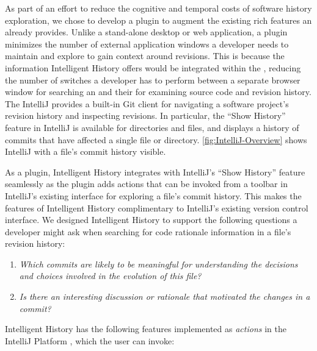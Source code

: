As part of an effort to reduce the cognitive and temporal costs of software history exploration, we chose to develop a plugin to augment the existing rich features an  already provides.
Unlike a stand-alone desktop or web application, a plugin minimizes the number of external application windows a developer needs to maintain and explore to gain context around revisions. 
This is because the information Intelligent History offers would be integrated within the , reducing the number of switches a developer has to perform between a separate browser window for searching an  and their  for examining source code and revision history.
The IntelliJ  provides a built-in Git client  for navigating a software project's revision history and inspecting revisions. 
In particular, the ``Show History'' feature in IntelliJ is available for directories and files, and displays a history of commits that have affected a single file or directory.
\autoref{fig:IntelliJ-Overview} shows IntelliJ with a file's commit history visible.

As a plugin, Intelligent History integrates with IntelliJ's ``Show History'' feature seamlessly as the plugin adds actions that can be invoked from a toolbar in IntelliJ's existing interface for exploring a file's commit history. 
This makes the features of Intelligent History complimentary to IntelliJ's existing version control interface.
We designed Intelligent History to support the following questions a developer might ask when searching for code rationale information in a file's revision history:

\begin{enumerate}[label={(\arabic*)}]
    \item \textit{Which commits are likely to be meaningful for understanding the decisions and choices involved in the evolution of this file?}
    \item \textit{Is there an interesting discussion or rationale that motivated the changes in a commit?}
\end{enumerate}

Intelligent History has the following features implemented as \emph{actions} in the IntelliJ Platform , which the user can invoke:

